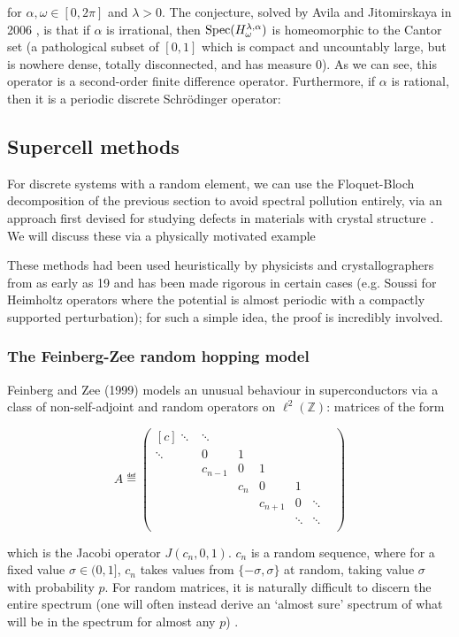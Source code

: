 \documentclass[../main.tex]{subfiles}
\begin{document}
for $\alpha, \omega \in [0, 2\pi]$ and $\lambda > 0$. The conjecture, solved by Avila and Jitomirskaya in 2006 \cite{avila2006ten}, is that if $\alpha$ is irrational, then $\mathrm{Spec}(H_\omega^{\lambda, \alpha})$ is homeomorphic to the Cantor set (a pathological subset of $[0, 1]$ which is compact and uncountably large, but is nowhere dense, totally disconnected, and has measure 0). As we can see, this operator is a second-order finite difference operator. Furthermore, if $\alpha$ is rational, then it is a periodic discrete Schr\"odinger operator:

\subsection{Supercell methods}
For discrete systems with a random element, we can use the Floquet-Bloch decomposition of the previous section to avoid spectral pollution entirely, via an approach first devised for studying defects in materials with crystal structure \cite{nieminen2007supercell}. We will discuss these via a physically motivated example

These methods had been used heuristically by physicists and crystallographers from as early as 19%
and has been made rigorous in certain cases (e.g. Soussi \cite{soussi2006convergence} for Heimholtz operators where the potential is almost periodic with a compactly supported perturbation); for such a simple idea, the proof is incredibly involved. 

\subsubsection{The Feinberg-Zee random hopping model}
Feinberg and Zee (1999) \cite{feinberg1999nonhermitian} models an unusual behaviour in superconductors via a class of non-self-adjoint and random operators on $\ell^2(\mathbb{Z})$: matrices of the form

$$
A \eqdef \begin{pmatrix*}[c]
\ddots & \ddots & & & & \\
\ddots & 0 & 1 & & & \\
& c_{n-1} & 0 & 1 & & \\
& & c_{n} & 0 & 1 & \\
& & & c_{n+1} & 0 & \ddots \\
& & & & \ddots & \ddots & \\
\end{pmatrix*}
$$

which is the Jacobi operator $J(c_n, 0, 1)$. $c_n$ is a random sequence, where for a fixed value $\sigma \in (0, 1]$, $c_n$ takes values from $\{-\sigma, \sigma\}$ at random, taking value $\sigma$ with probability $p$. For random matrices, it is naturally difficult to discern the entire spectrum (one will often instead derive an `almost sure' spectrum of what will be in the spectrum for almost any $p$) \cite{chandler-wilde2012spectrum}.\\
\end{document}
